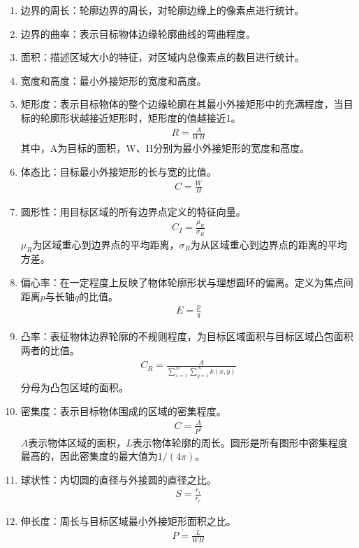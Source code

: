\begin{enumerate}

\item 边界的周长：轮廓边界的周长，对轮廓边缘上的像素点进行统计。

\item 边界的曲率：表示目标物体边缘轮廓曲线的弯曲程度。

\item 面积：描述区域大小的特征，对区域内总像素点的数目进行统计。

\item 宽度和高度：最小外接矩形的宽度和高度。

\item 矩形度：表示目标物体的整个边缘轮廓在其最小外接矩形中的充满程度，当目标的轮廓形状越接近矩形时，矩形度的值越接近1。
    \begin{align}
    R=\frac{A}{WH}
    \end{align}
    其中，A为目标的面积，W、H分别为最小外接矩形的宽度和高度。

\item 体态比：目标最小外接矩形的长与宽的比值。
    \begin{align}
    C=\frac{W}{H}
    \end{align}
    
\item 圆形性：用目标区域的所有边界点定义的特征向量。
    \begin{align}
    C_{I}=\frac{\mu_{R}}{\sigma_{R}}
    \end{align}
    $\mu_{R}$为区域重心到边界点的平均距离，$\sigma_{R}$为从区域重心到边界点的距离的平均方差。

\item 偏心率：在一定程度上反映了物体轮廓形状与理想圆环的偏离。定义为焦点间距离$p$与长轴$q$的比值。
    \begin{align}
    E=\frac{p}{q}
    \end{align}
    
\item 凸率：表征物体边界轮廓的不规则程度，为目标区域面积与目标区域凸包面积两者的比值。
    \begin{align}
    C_{R}=\frac{A}{\sum_{x=1}^{M}\sum_{y=1}^{N}k(x,y)}
    \end{align}
    分母为凸包区域的面积。
    
\item 密集度：表示目标物体围成的区域的密集程度。
    \begin{align}
    C = \frac{A}{P^2}
    \end{align}
    $A$表示物体区域的面积，$L$表示物体轮廓的周长。圆形是所有图形中密集程度最高的，因此密集度的最大值为$1/(4\pi)$。
    
\item 球状性：内切圆的直径与外接圆的直径之比。
    \begin{align}
    S=\frac{r_{i}}{r_{c}}
    \end{align}
    
\item 伸长度：周长与目标区域最小外接矩形面积之比。
    \begin{align}
    P=\frac{L}{WH}
    \end{align}
\end{enumerate}
    

